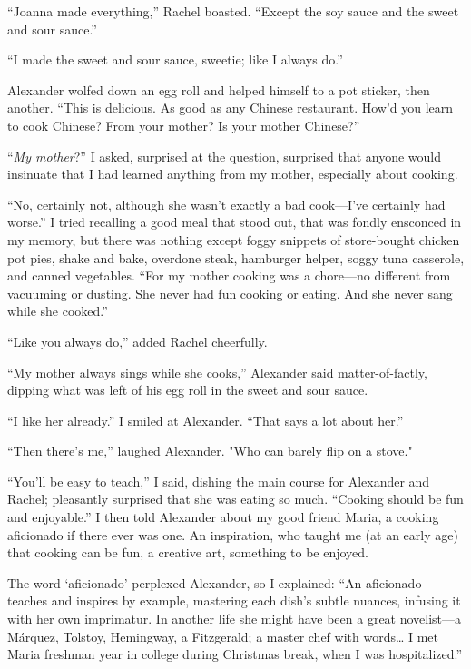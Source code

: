 ``Joanna made everything,'' Rachel boasted. ``Except the soy sauce and
the sweet and sour sauce.''

``I made the sweet and sour sauce, sweetie; like I always do.''

Alexander wolfed down an egg roll and helped himself to a pot sticker,
then another. ``This is delicious. As good as any Chinese restaurant.
How'd you learn to cook Chinese? From your mother? Is your mother
Chinese?''

``\emph{My mother}?'' I asked, surprised at the question, surprised that
anyone would insinuate that I had learned anything from my mother,
especially about cooking.

``No, certainly not, although she wasn't exactly a bad cook---I've
certainly had worse.'' I tried recalling a good meal that stood out,
that was fondly ensconced in my memory, but there was nothing except
foggy snippets of store-bought chicken pot pies, shake and bake,
overdone steak, hamburger helper, soggy tuna casserole, and canned
vegetables. ``For my mother cooking was a chore---no different from
vacuuming or dusting. She never had fun cooking or eating. And she never
sang while she cooked.''

``Like you always do,'' added Rachel cheerfully.

``My mother always sings while she cooks,'' Alexander said
matter-of-factly, dipping what was left of his egg roll in the sweet and
sour sauce.

``I like her already.'' I smiled at Alexander. ``That says a lot about
her.''

``Then there's me,'' laughed Alexander. "Who can barely flip on a
stove."

``You'll be easy to teach,'' I said, dishing the main course for
Alexander and Rachel; pleasantly surprised that she was eating so much.
``Cooking should be fun and enjoyable.'' I then told Alexander about my
good friend Maria, a cooking aficionado if there ever was one. An
inspiration, who taught me (at an early age) that cooking can be fun, a
creative art, something to be enjoyed.

The word `aficionado' perplexed Alexander, so I explained: ``An
aficionado teaches and inspires by example, mastering each dish's subtle
nuances, infusing it with her own imprimatur. In another life she might
have been a great novelist---a Márquez, Tolstoy, Hemingway, a
Fitzgerald; a master chef with words\ldots{} I met Maria freshman year
in college during Christmas break, when I was hospitalized.''

